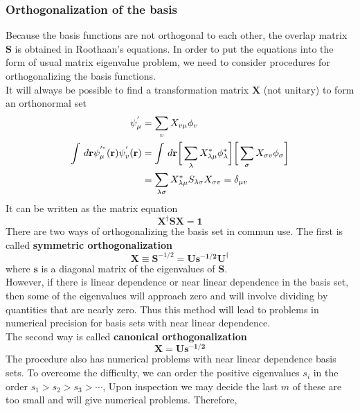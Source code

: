\documentclass[11pt]{article}
\begin{document}
\subsubsection{Orthogonalization of the basis}
Because the basis functions are not orthogonal to each other, the overlap matrix $\mathbf{S}$ is obtained in Roothaan's equations. In order
to put the equations into the form of usual matrix eigenvalue problem, we need to consider procedures for orthogonalizing the basis functions.\\
It will always be possible to find a transformation matrix $\mathbf{X}$ (not unitary) to form an orthonormal set
\begin{align}
    \psi_\mu^{'}&=\sum_{v}X_{v \mu}\phi_v\\
    \int\,d\mathbf{r}\psi_\mu^{'^{*}}(\mathbf{r})\psi_v^{'}(\mathbf{r})&=\int\,d\mathbf{r}\bigg[\sum_{\lambda}X_{\lambda \mu}^*\phi_\lambda^*\bigg]
    \bigg[\sum_{\sigma}X_{\sigma v}\phi_\sigma\bigg]\notag\\
    &=\sum_{\lambda \sigma}X_{\lambda \mu}^*S_{\lambda \sigma}X_{\sigma v}=\delta_{\mu v}
\end{align}
It can be written as the matrix equation
\begin{equation}
    \mathbf{X^\dagger S X}=\mathbf{1}
\end{equation}
There are two ways of orthogonalizing the basis set in commun use. The first is called \textbf{symmetric orthogonalization}
\begin{equation}
    \mathbf{X}\equiv\textbf{S}^{-1/2}=\mathbf{Us^{-1/2}U^\dagger}
\end{equation}
where $\mathbf{s}$ is a diagonal matrix of the eigenvalues of $\mathbf{S}$.\\
However, if there is linear dependence or near linear dependence in the basis set, then some of the eigenvalues will approach zero and will
involve dividing by quantities that are nearly zero. Thus this method will lead to problems in numerical precision for basis sets with near
linear dependence.\\
The second way is called \textbf{canonical orthogonalization}
\begin{equation}
    \mathbf{X}=\mathbf{Us^{-1/2}}
\end{equation}
The procedure also has numerical problems with near linear dependence basis sets. To overcome the difficulty, we can order the positive eigenvalues
$s_i$ in the order $s_1>s_2>s_3>\cdots$, Upon inspection we may decide the last $m$ of these are too small and will give numerical problems. Therefore,
\end{document}
